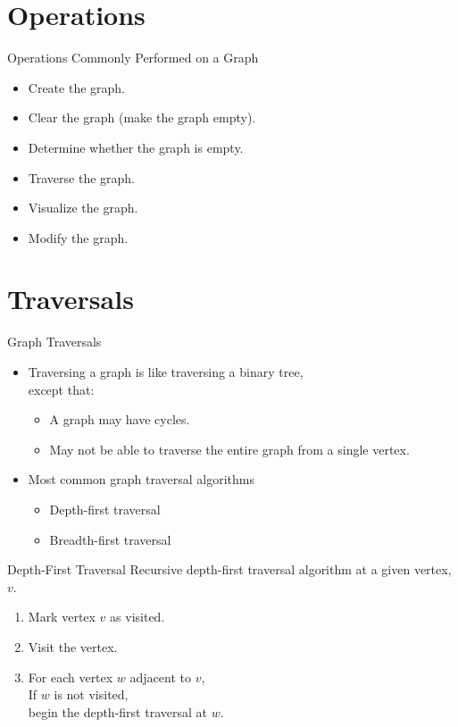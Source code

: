 \documentclass[14pt,aspectratio=1610]{beamer}
\begin{document}
\section*{Operations}

\begin{frame}{Operations Commonly Performed on a Graph}
\begin{itemize}
  \item
    Create the graph.
  \item
    Clear the graph (make the graph empty).
  \item
    Determine whether the graph is empty.
  \item
    Traverse the graph.
  \item
    Visualize the graph.
  \item
    Modify the graph.
\end{itemize}
\end{frame}

\section{Traversals}

\begin{frame}{Graph Traversals}
\begin{itemize}
  \item
    Traversing a graph is like traversing a binary tree, \\except that:
    \begin{itemize}
      \item
        A graph may have cycles.
      \item
        May not be able to traverse the entire graph from a single vertex.
    \end{itemize}
  \item
    Most common graph traversal algorithms
    \begin{itemize}
      \item
        Depth-first traversal
      \item
        Breadth-first traversal
    \end{itemize}
\end{itemize}
\end{frame}

\begin{frame}{Depth-First Traversal}
Recursive depth-first traversal algorithm at a given vertex, \(v\).
\begin{enumerate}
  \item
    Mark vertex \(v\) as visited.
  \item
    Visit the vertex.
  \item
    For each vertex \(w\) adjacent to \(v\),\\
    \hspace{1em}If \(w\) is not visited,\\
    \hspace{2em}begin the depth-first traversal at \(w\).
\end{enumerate}
\end{frame}
\end{document}
